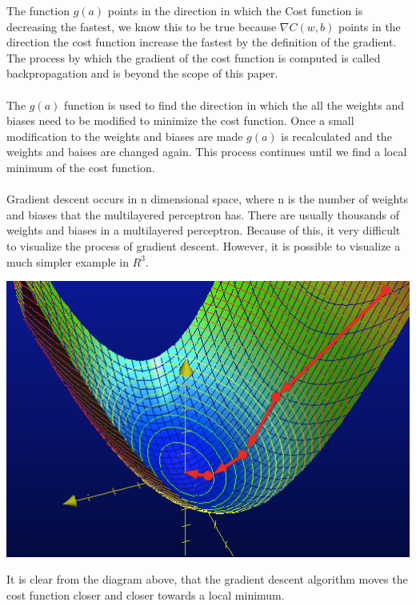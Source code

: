 The function $g(a)$ points in the direction in which the Cost function is decreasing the fastest, we know this to be true because $\nabla C(w,b)$ points in the direction the cost function increase the fastest by the definition of the gradient. The process by which the gradient of the cost function is computed is called backpropagation and is beyond the scope of this paper.\\ \\

The $g(a)$ function is used to find the direction in which the all the weights and biases need to be modified to minimize the cost function. Once a small modification to the weights and biases are made $g(a)$ is recalculated and the weights and baises are changed again. This process continues until we find a local minimum of the cost function.\\ \\

Gradient descent occurs in n dimensional space, where n is the number of weights and biases that the multilayered perceptron has. There are usually thousands of weights and biases in a multilayered perceptron. Because of this, it very difficult to visualize the process of gradient descent. However, it is possible to visualize a much simpler example in $R^3$.

\begin{center}
	\includegraphics[scale=0.5]{images/gradientdescent}
\end{center}

It is clear from the diagram above, that the gradient descent algorithm moves the cost function closer and closer towards a local minimum.\\ \\

